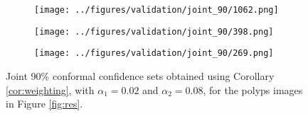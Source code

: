 \begin{figure}[h!]
	\begin{subfigure}{0.18\textwidth}
		\centering
		\texttt{[image: ../figures/validation/joint\_90/1062.png]}
		\label{fig:1}
	\end{subfigure}
	\begin{subfigure}{0.18\textwidth}
		\centering
		\texttt{[image: ../figures/validation/joint\_90/398.png]}
		\label{fig:1}
	\end{subfigure}
	\begin{subfigure}{0.18\textwidth}
		\centering
		\texttt{[image: ../figures/validation/joint\_90/269.png]}
		\label{fig:1}
	\end{subfigure}
	\label{fig:grid}
	\caption{Joint 90\% conformal confidence sets obtained using Corollary \ref{cor:weighting}, with $\alpha_1 = 0.02$ and $\alpha_2 = 0.08$, for the polyps images in Figure \ref{fig:res}.}\label{fig:joint}
\end{figure}
\newpage
